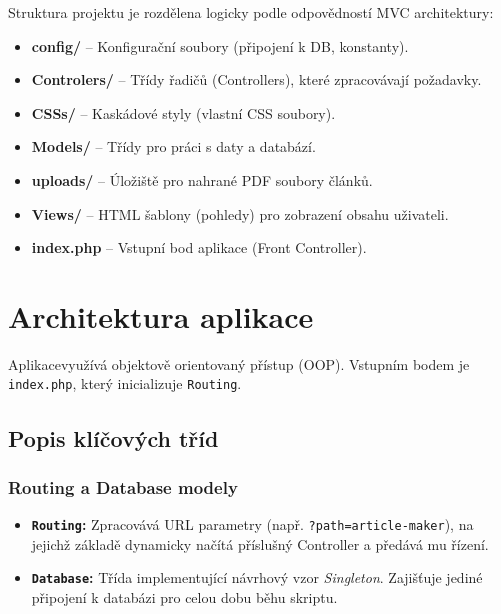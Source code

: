 \documentclass[12pt,a4paper]{article}
\begin{document}
Struktura projektu je rozdělena logicky podle odpovědností MVC architektury:

\begin{itemize}
    \item \textbf{config/} -- Konfigurační soubory (připojení k DB, konstanty).
    \item \textbf{Controlers/} -- Třídy řadičů (Controllers), které zpracovávají požadavky.
    \item \textbf{CSSs/} -- Kaskádové styly (vlastní CSS soubory).
    \item \textbf{Models/} -- Třídy pro práci s daty a databází.
    \item \textbf{uploads/} -- Úložiště pro nahrané PDF soubory článků.
    \item \textbf{Views/} -- HTML šablony (pohledy) pro zobrazení obsahu uživateli.
    \item \textbf{index.php} -- Vstupní bod aplikace (Front Controller).
    
\end{itemize}

\section{Architektura aplikace}

Aplikacevyužívá objektově orientovaný přístup (OOP). Vstupním bodem je \texttt{index.php}, který inicializuje \texttt{Routing}.

\subsection{Popis klíčových tříd}

\subsubsection{Routing a Database modely}
\begin{itemize}
    \item \textbf{\texttt{Routing}:} Zpracovává URL parametry (např. \texttt{?path=article-maker}), na jejichž základě dynamicky načítá příslušný Controller a předává mu řízení.
    \item \textbf{\texttt{Database}:} Třída implementující návrhový vzor \textit{Singleton}. Zajišťuje jediné připojení k databázi pro celou dobu běhu skriptu.
\end{itemize}
\end{document}
